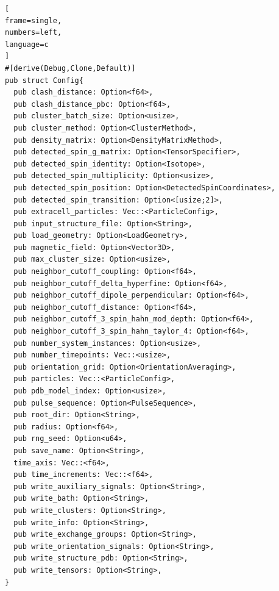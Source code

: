 \documentclass{book}
\begin{document}
\begin{lstlisting}[
frame=single,
numbers=left,
language=c
]
#[derive(Debug,Clone,Default)]
pub struct Config{
  pub clash_distance: Option<f64>,
  pub clash_distance_pbc: Option<f64>,
  pub cluster_batch_size: Option<usize>,
  pub cluster_method: Option<ClusterMethod>,
  pub density_matrix: Option<DensityMatrixMethod>,
  pub detected_spin_g_matrix: Option<TensorSpecifier>,
  pub detected_spin_identity: Option<Isotope>,
  pub detected_spin_multiplicity: Option<usize>,
  pub detected_spin_position: Option<DetectedSpinCoordinates>,
  pub detected_spin_transition: Option<[usize;2]>,
  pub extracell_particles: Vec::<ParticleConfig>,
  pub input_structure_file: Option<String>,
  pub load_geometry: Option<LoadGeometry>,
  pub magnetic_field: Option<Vector3D>,
  pub max_cluster_size: Option<usize>,
  pub neighbor_cutoff_coupling: Option<f64>,
  pub neighbor_cutoff_delta_hyperfine: Option<f64>,
  pub neighbor_cutoff_dipole_perpendicular: Option<f64>,
  pub neighbor_cutoff_distance: Option<f64>,
  pub neighbor_cutoff_3_spin_hahn_mod_depth: Option<f64>,
  pub neighbor_cutoff_3_spin_hahn_taylor_4: Option<f64>,
  pub number_system_instances: Option<usize>,
  pub number_timepoints: Vec::<usize>,
  pub orientation_grid: Option<OrientationAveraging>,
  pub particles: Vec::<ParticleConfig>,
  pub pdb_model_index: Option<usize>,
  pub pulse_sequence: Option<PulseSequence>,
  pub root_dir: Option<String>,
  pub radius: Option<f64>,
  pub rng_seed: Option<u64>,
  pub save_name: Option<String>,
  time_axis: Vec::<f64>,
  pub time_increments: Vec::<f64>,
  pub write_auxiliary_signals: Option<String>, 
  pub write_bath: Option<String>,
  pub write_clusters: Option<String>,
  pub write_info: Option<String>,
  pub write_exchange_groups: Option<String>,
  pub write_orientation_signals: Option<String>,
  pub write_structure_pdb: Option<String>,
  pub write_tensors: Option<String>,
}
\end{lstlisting}
\printbibliography
\end{document}

